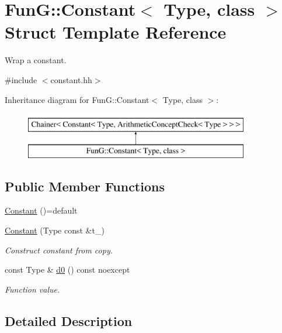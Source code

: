 \hypertarget{structFunG_1_1Constant}{\section{Fun\-G\-:\-:Constant$<$ Type, class $>$ Struct Template Reference}
\label{structFunG_1_1Constant}
}


Wrap a constant.  




{\ttfamily \#include $<$constant.\-hh$>$}

Inheritance diagram for Fun\-G\-:\-:Constant$<$ Type, class $>$\-:\begin{figure}[H]
\begin{center}
\leavevmode
\includegraphics[height=2.000000cm]{structFunG_1_1Constant}
\end{center}
\end{figure}
\subsection*{Public Member Functions}
\begin{DoxyCompactItemize}
\item 
\hyperlink{structFunG_1_1Constant_a29ead8431e2fadfef397aae5dc5a4511}{Constant} ()=default
\item 
\hyperlink{structFunG_1_1Constant_a310783597f488e554de12627bf56aec8}{Constant} (Type const \&t\-\_\-)
\begin{DoxyCompactList}\small\item\em Construct constant from copy. \end{DoxyCompactList}\item 
const Type \& \hyperlink{structFunG_1_1Constant_aad514a9470fbe1c47c0f07da6e160416}{d0} () const noexcept
\begin{DoxyCompactList}\small\item\em Function value. \end{DoxyCompactList}\end{DoxyCompactItemize}


\subsection{Detailed Description}
